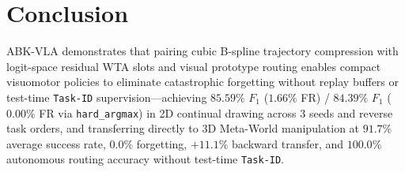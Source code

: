 \documentclass[10pt,twocolumn]{article}
\begin{document}
\section{Conclusion}
ABK-VLA demonstrates that pairing cubic B-spline trajectory compression with logit-space residual WTA slots and visual prototype routing enables compact visuomotor policies to eliminate catastrophic forgetting without replay buffers or test-time \texttt{Task-ID} supervision---achieving $85.59\%$ $F_1$ ($1.66\%$ FR) / $84.39\%$ $F_1$ ($0.00\%$ FR via \texttt{hard\_argmax}) in 2D continual drawing across 3 seeds and reverse task orders, and transferring directly to 3D Meta-World manipulation at $91.7\%$ average success rate, $0.0\%$ forgetting, $+11.1\%$ backward transfer, and $100.0\%$ autonomous routing accuracy without test-time \texttt{Task-ID}.
\end{document}
